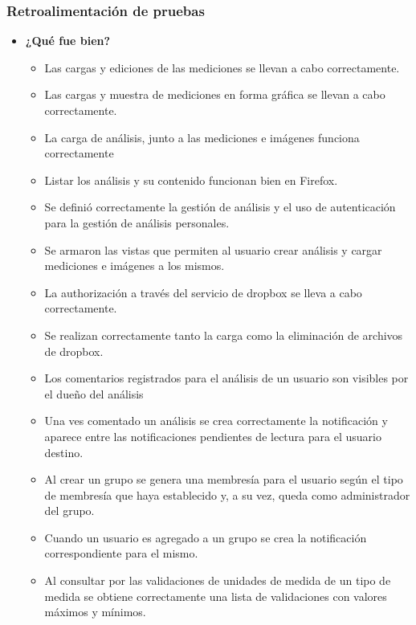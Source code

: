  \subsubsection{Retroalimentación de pruebas}
 	\begin{itemize}
 		\item \textbf{¿Qué fue bien?}
 		\begin{itemize}
 			\item        Las cargas y ediciones de las mediciones se llevan a cabo correctamente.		
			\item        Las cargas y muestra de mediciones en forma gráfica se llevan a cabo correctamente.			
			\item La carga de análisis, junto a las mediciones e imágenes funciona correctamente
			\item Listar los análisis y su contenido funcionan bien en Firefox.
			\item Se definió correctamente la gestión de análisis y el uso de autenticación para la gestión de análisis personales.
			\item Se armaron las vistas que permiten al usuario crear análisis y cargar mediciones e imágenes a los mismos.			
			\item La authorización a través del servicio de dropbox se lleva a cabo correctamente.
			\item Se realizan correctamente tanto la carga como la eliminación de archivos de dropbox.	
			\item  Los comentarios registrados para el análisis de un usuario son visibles por el dueño del análisis
			\item Una ves comentado un análisis se crea correctamente la notificación y aparece entre las notificaciones pendientes de lectura para el usuario destino.
			\item Al crear un grupo se genera una membresía para el usuario según el tipo de membresía que haya establecido y, a su vez, queda como administrador del grupo. 
			\item Cuando un usuario es agregado a un grupo se crea la notificación correspondiente para el mismo.
			\item Al consultar por las validaciones de unidades de medida de un tipo de medida se obtiene correctamente una lista de validaciones con valores máximos y mínimos.		
 		\end{itemize}
 		

\end{itemize}
